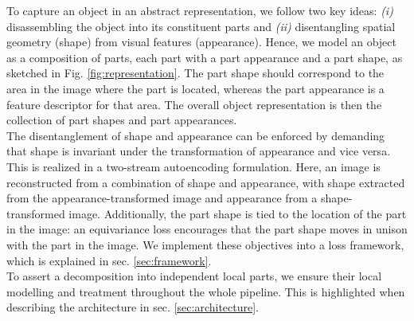 	To capture an object in an abstract representation, we follow two key ideas: \emph{(i)} disassembling the object into its constituent parts and \emph{(ii)} disentangling spatial geometry (shape) from visual features (appearance). Hence, we model an object as a composition of parts, each part with a part appearance and a part shape, as sketched in Fig. \ref{fig:representation}. The part shape should correspond to the area in the image where the part is located, whereas the part appearance is a feature descriptor for that area. The overall object representation is then the collection of part shapes and part appearances. \\
	The disentanglement of shape and appearance can be enforced by demanding that shape is invariant under the transformation of appearance and vice versa. This is realized in a two-stream autoencoding formulation. Here, an image is reconstructed from a combination of shape and appearance, with shape extracted from the appearance-transformed image and appearance from a shape-transformed image. Additionally, the part shape is tied to the location of the part in the image: an equivariance loss encourages that the part shape moves in unison with the part in the image. We implement these objectives into a loss framework, which is explained in sec. \ref{sec:framework}. \\
	To assert a decomposition into independent local parts, we ensure their local modelling and treatment throughout the whole pipeline. This is highlighted when describing the architecture in sec. \ref{sec:architecture}.

